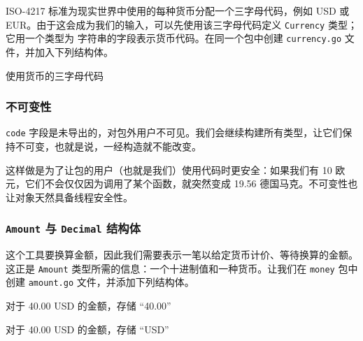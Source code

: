 ISO-4217 标准为现实世界中使用的每种货币分配一个三字母代码，例如 USD 或 EUR。由于这会成为我们的输入，可以先使用该三字母代码定义 \texttt{Currency} 类型；它用一个类型为
字符串的字段表示货币代码。在同一个包中创建 \texttt{currency.go} 文件，并加入下列结构体。


\begin{codeannotations}
\item 使用货币的三字母代码
\end{codeannotations}

\subsubsection*{不可变性}

\texttt{code} 字段是未导出的，对包外用户不可见。我们会继续构建所有类型，让它们保持不可变，也就是说，一经构造就不能改变。

这样做是为了让包的用户（也就是我们）使用代码时更安全：如果我们有 10 欧元，它们不会仅仅因为调用了某个函数，就突然变成 19.56 德国马克。不可变性也让对象天然具备线程安全性。

\subsubsection*{\texttt{Amount} 与 \texttt{Decimal} 结构体}

这个工具要换算金额，因此我们需要表示一笔以给定货币计价、等待换算的金额。这正是 \texttt{Amount} 类型所需的信息：一个十进制值和一种货币。让我们在 \texttt{money} 包中创建 \texttt{amount.go} 文件，并添加下列结构体。


\begin{codeannotations}
\item 对于 40.00 USD 的金额，存储 ``40.00''
\item 对于 40.00 USD 的金额，存储 ``USD''
\end{codeannotations}

